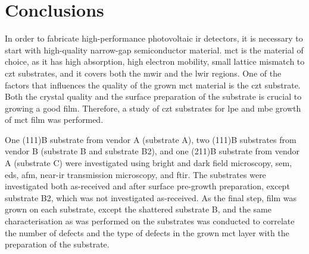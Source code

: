\chapter{Conclusions}\label{ch:conclusion}

In order to fabricate high-performance photovoltaic \ac{ir} detectors, it is necessary to start with high-quality narrow-gap semiconductor material. \Ac{mct} is the material of choice, as it has high absorption, high electron mobility, small lattice mismatch to \ac{czt} substrates, and it covers both the \ac{mwir} and the \ac{lwir} regions. One of the factors that influences the quality of the grown \ac{mct} material is the \ac{czt} substrate. Both the crystal quality and the surface preparation of the substrate is crucial to growing a good film. Therefore, a study of \ac{czt} substrates for \ac{lpe} and \ac{mbe} growth of \ac{mct} film was performed.

One (111)B substrate from vendor A (substrate A), two (111)B substrates from vendor B (substrate B and substrate B2), and one (211)B substrate from vendor A (substrate C) were investigated using bright and dark field microscopy, \ac{sem}, \ac{eds}, \ac{afm}, near-\ac{ir} transmission microscopy, and \ac{ftir}. The substrates were investigated both as-received and after surface pre-growth preparation, except substrate B2, which was not investigated as-received. As the final step,  film was grown on each substrate, except the shattered substrate B, and the same characterisation as was performed on the substrates was conducted to correlate the number of defects and the type of defects in the grown \ac{mct} layer with the preparation of the substrate.


